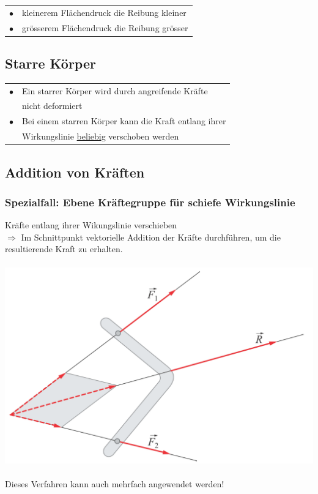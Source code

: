 			\begin{tabular}{ll}
				$\bullet$ & kleinerem Flächendruck die Reibung kleiner \\
				$\bullet$ & grösserem Flächendruck die Reibung grösser \\
			\end{tabular}
		
	\subsection{Starre Körper}
	
		\begin{tabular}{ll}
			$\bullet$ & Ein starrer Körper wird durch angreifende Kräfte \\
			& nicht deformiert \\
			$\bullet$ & Bei einem starren Körper kann die Kraft entlang ihrer  \\
			& Wirkungslinie \underline{beliebig} verschoben werden \\
		\end{tabular}
	
	\subsection{Addition von Kräften}
		
		\subsubsection{Spezialfall: Ebene Kräftegruppe für schiefe Wirkungslinie}
			Kräfte entlang ihrer Wikungslinie verschieben \\
			$\Rightarrow$ Im Schnittpunkt vektorielle Addition der Kräfte durchführen, um die resultierende Kraft zu erhalten. \\
			\\
			\includegraphics[width=0.7\linewidth]{Bilder/schneidende_wirkungslinien} \\
			\\
			Dieses Verfahren kann auch mehrfach angewendet werden!


